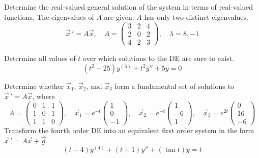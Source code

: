 \documentclass[12pt]{exam}
\begin{document}
    


\newpage

\begin{questions}




    \newpage
    \question[9] Determine the real-valued general solution of the system in terms of real-valued functions. The eigenvalues of $A$ are given. $A$ has only two distinct eigenvalues. $$\vec x \, ' = A\vec x, \quad A = \begin{pmatrix} 3&2&4\\2&0&2\\4&2&3\end{pmatrix}, \quad \lambda = 8, -1$$ %

\newpage 

\question[4] Determine all values of $t$ over which solutions to the DE are sure to exist. $$(t^2-25)y^{(6)}+t^2y''+5y = 0$$ %

 \vspace{8cm}
 
\newpage 

\question[4] Determine whether $\vec x_1$, $\vec x_2$, and $\vec x_3$ form a fundamental set of solutions to $\vec x \, ' = A \vec x$, where $$A = \begin{pmatrix}0&1&1\\1&0&1\\1&1&0 \end{pmatrix}, \quad \vec x_1 = e^{-t}\begin{pmatrix} 1\\0\\-1\end{pmatrix}, \quad \vec x_2 = e^{-t} \begin{pmatrix}1\\-6\\1 \end{pmatrix}, \quad \vec x_3 = e^{2t} \begin{pmatrix} 0\\16\\-6\end{pmatrix}$$
\newpage 
\question[2] Transform the fourth order DE into an equivalent first order system in the form $\vec x \, ' = A \vec x + \vec g$. $$(t-4)y^{(4)}+(t+1)y''+ (\tan t )y = t$$ %


\end{questions}
\end{document}
